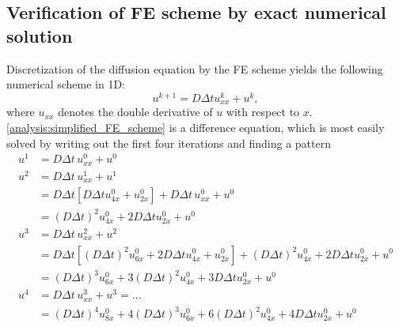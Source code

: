\subsection{Verification of FE scheme by exact numerical solution}\label{exact_numerical_solution}

Discretization of the diffusion equation by the FE scheme yields the following numerical scheme in 1D:
\begin{equation}\label{analysis:simplified_FE_scheme}
 u^{k+1} = D\Delta t u^k_{xx} + u^k,
\end{equation}
where $u_{xx}$ denotes the double derivative of $u$ with respect to $x$. 
\eqref{analysis:simplified_FE_scheme} is a difference equation, which is most easily solved by writing out the first four iterations and finding a pattern
\begin{align*}
 u^1 &= D\Delta t\, u_{xx}^0 + u^0 \\
 u^2 &= D\Delta t\, u_{xx}^1 + u^1 \\
 &= D\Delta t\left[D\Delta t u_{4x}^0 + u_{2x}^0\right] + D\Delta t\, u_{xx}^0 +u^0\\
 &= \left(D\Delta t\right)^2 u_{4x}^0 + 2D\Delta t u_{2x}^0+ u^0 \\
 u^3 &= D\Delta t\, u_{xx}^2 + u^2 \\
 &= D\Delta t\left[\left(D\Delta t\right)^2 u_{6x}^0 + 2D\Delta t u_{4x}^0+ u_{2x}^0\right] + \left(D\Delta t\right)^2 u_{4x}^0 + 2D\Delta t u_{2x}^0+ u^0\\
 &= \left(D\Delta t\right)^3 u_{6x}^0 + 3\left(D\Delta t\right)^2 u_{4x}^0+ 3D\Delta tu_{2x}^0 + u^0 \\
 u^4 &= D\Delta t \,u_{xx}^3 + u^3 = \dots \\
 &= \left(D\Delta t\right)^4 u_{8x}^0 + 4\left(D\Delta t\right)^3 u_{6x}^0+ 6\left(D\Delta t\right)^2 u_{4x}^0 + 4D\Delta t u_{2x}^0 + u^0 
\end{align*}

